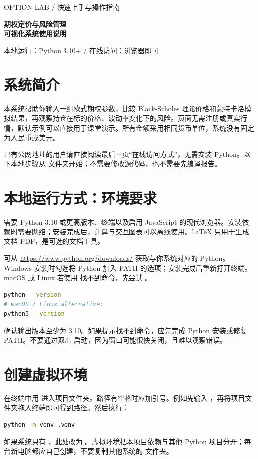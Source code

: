 \documentclass[UTF8,a4paper,12pt]{ctexart}
\begin{document}
\begin{center}
{\small\color{brand}OPTION LAB / 快速上手与操作指南}\par\vspace{.5cm}
{\LARGE\bfseries 期权定价与风险管理\\[.3em]可视化系统使用说明}\par\vspace{.4cm}
{\small 本地运行：Python 3.10+ / 在线访问：浏览器即可}
\end{center}

\section{系统简介}
本系统帮助你输入一组欧式期权参数，比较 Black-Scholes 理论价格和蒙特卡洛模拟结果，再观察持仓在标的价格、波动率变化下的风险。页面无需注册或真实行情，默认示例可以直接用于课堂演示。所有金额采用相同货币单位，系统没有固定为人民币或美元。

已有公网地址的用户请直接阅读最后一页“在线访问方式”，无需安装 Python。以下本地步骤从  文件夹开始；不需要修改源代码，也不需要先编译报告。

\section{本地运行方式：环境要求}
需要 Python 3.10 或更高版本、终端以及启用 JavaScript 的现代浏览器。安装依赖时需要网络；安装完成后，计算与交互图表可以离线使用。LaTeX 只用于生成文档 PDF，是可选的文档工具。

可从 \url{https://www.python.org/downloads/} 获取与你系统对应的 Python。Windows 安装时勾选将 Python 加入 PATH 的选项；安装完成后重新打开终端。macOS 或 Linux 若使用  找不到命令，先尝试 。

\begin{lstlisting}[language=bash]
python --version
# macOS / Linux alternative:
python3 --version
\end{lstlisting}
确认输出版本至少为 3.10。如果提示找不到命令，应先完成 Python 安装或修复 PATH。不要通过双击  启动，因为窗口可能很快关闭，且难以观察错误。

\section{创建虚拟环境}
在终端中用  进入项目文件夹。路径有空格时应加引号。例如先输入 ，再将项目文件夹拖入终端即可得到路径。然后执行：
\begin{lstlisting}[language=bash]
python -m venv .venv
\end{lstlisting}
如果系统只有 ，此处改为 。虚拟环境把本项目依赖与其他 Python 项目分开；每台新电脑都应自己创建，不要复制其他系统的  文件夹。
\end{document}
